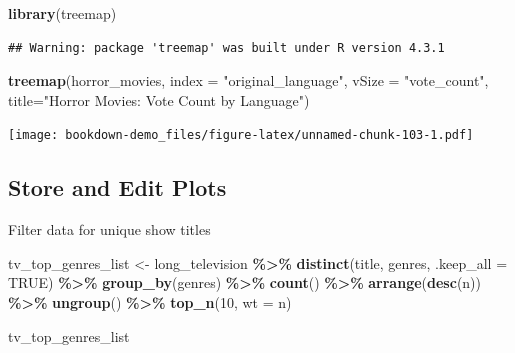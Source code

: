 \documentclass[
  b5paper]{book}
\newenvironment{Shaded}{\begin{snugshade}}{\end{snugshade}}
\newcommand{\AttributeTok}[1]{\textcolor[rgb]{0.13,0.29,0.53}{#1}}
\newcommand{\ConstantTok}[1]{\textcolor[rgb]{0.56,0.35,0.01}{#1}}
\newcommand{\DecValTok}[1]{\textcolor[rgb]{0.00,0.00,0.81}{#1}}
\newcommand{\FunctionTok}[1]{\textcolor[rgb]{0.13,0.29,0.53}{\textbf{#1}}}
\newcommand{\NormalTok}[1]{#1}
\newcommand{\OtherTok}[1]{\textcolor[rgb]{0.56,0.35,0.01}{#1}}
\newcommand{\SpecialCharTok}[1]{\textcolor[rgb]{0.81,0.36,0.00}{\textbf{#1}}}
\newcommand{\StringTok}[1]{\textcolor[rgb]{0.31,0.60,0.02}{#1}}
\begin{document}
\begin{Shaded}
\begin{Highlighting}[]
\FunctionTok{library}\NormalTok{(treemap)}
\end{Highlighting}
\end{Shaded}

\begin{verbatim}
## Warning: package 'treemap' was built under R version 4.3.1
\end{verbatim}

\begin{Shaded}
\begin{Highlighting}[]
\FunctionTok{treemap}\NormalTok{(horror\_movies, }
        \AttributeTok{index =} \StringTok{"original\_language"}\NormalTok{, }
        \AttributeTok{vSize =} \StringTok{"vote\_count"}\NormalTok{, }
        \AttributeTok{title=}\StringTok{"Horror Movies: Vote Count by Language"}\NormalTok{)}
\end{Highlighting}
\end{Shaded}

\texttt{[image: bookdown-demo\_files/figure-latex/unnamed-chunk-103-1.pdf]}

\hypertarget{store-and-edit-plots}{%
\subsection*{Store and Edit Plots}\label{store-and-edit-plots}}

Filter data for unique show titles

\begin{Shaded}
\begin{Highlighting}[]
\NormalTok{tv\_top\_genres\_list }\OtherTok{\textless{}{-}}\NormalTok{ long\_television }\SpecialCharTok{\%\textgreater{}\%}
  \FunctionTok{distinct}\NormalTok{(title, genres, }\AttributeTok{.keep\_all =} \ConstantTok{TRUE}\NormalTok{) }\SpecialCharTok{\%\textgreater{}\%}
  \FunctionTok{group\_by}\NormalTok{(genres) }\SpecialCharTok{\%\textgreater{}\%}
  \FunctionTok{count}\NormalTok{() }\SpecialCharTok{\%\textgreater{}\%}
  \FunctionTok{arrange}\NormalTok{(}\FunctionTok{desc}\NormalTok{(n)) }\SpecialCharTok{\%\textgreater{}\%}
  \FunctionTok{ungroup}\NormalTok{() }\SpecialCharTok{\%\textgreater{}\%}
  \FunctionTok{top\_n}\NormalTok{(}\DecValTok{10}\NormalTok{, }\AttributeTok{wt =}\NormalTok{ n)}

\NormalTok{tv\_top\_genres\_list}
\end{Highlighting}
\end{Shaded}
\end{document}

